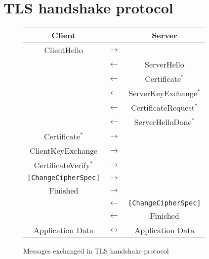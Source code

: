 \documentclass[a4paper,fleqn]{cas-dc}
\begin{document}


\section{TLS handshake protocol}\label{tls}


\begin{figure}[]
	\centering
	\begin{tabular}{ c c c }
		Client &  & Server \\ 
		\hline
		ClientHello & $\rightarrow$ & \\ 
		& $\leftarrow$ & ServerHello \\  
		& $\leftarrow$ & Certificate$^*$ \\  
		& $\leftarrow$ & ServerKeyExchange$^*$ \\  
		& $\leftarrow$ & CertificateRequest$^*$ \\  
		& $\leftarrow$ & ServerHelloDone$^*$ \\  
		Certificate$^*$ & $\rightarrow$ & \\ 
		ClientKeyExchange & $\rightarrow$ & \\ 
		CertificateVerify$^*$ & $\rightarrow$ & \\ 
		\verb![ChangeCipherSpec]! & $\rightarrow$ & \\ 
		Finished & $\rightarrow$ & \\ 
		& $\leftarrow$ & \verb![ChangeCipherSpec]! \\  
		& $\leftarrow$ & Finished \\ 
		Application Data & $\leftrightarrow$ & Application Data \\ 
	\end{tabular}
	\caption{Messages exchanged in TLS handshake protocol}
	\label{fig:tb1}
\end{figure}
\end{document}
